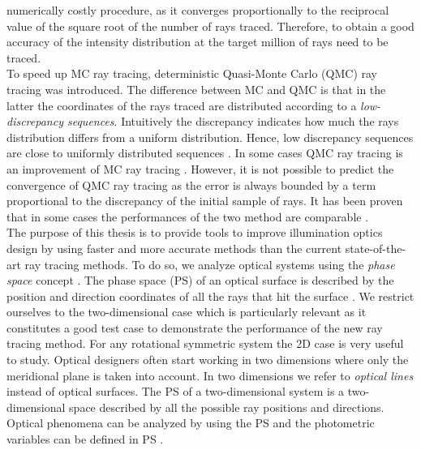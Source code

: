 numerically costly procedure, as it converges proportionally
to the reciprocal value of the square root of the number of rays
traced. Therefore, to obtain a good accuracy of the intensity distribution at the target million of rays need to be traced.\\ \indent To speed up MC ray tracing, deterministic Quasi-Monte Carlo (QMC) ray tracing was introduced. The difference between MC and QMC is that in the latter the coordinates of the rays traced are distributed according to a \textit{low-discrepancy sequences}. Intuitively the discrepancy indicates how much the rays distribution differs from a uniform distribution.  Hence, low discrepancy sequences are close to uniformly distributed sequences \cite{levy2002introduction}.
In some cases QMC ray tracing is an improvement of MC ray tracing \cite{ohbuchi1996quasi, caflisch1998monte}. However, it is not possible to predict the convergence of QMC ray tracing as the error is always bounded by a term proportional to the discrepancy of the initial sample of rays. It has been proven that in some cases the performances of the two method are comparable \cite{tuffin2004randomization}. 
\\ \indent The purpose of this thesis is to provide tools to improve illumination optics design by using faster and more accurate methods than the current state-of-the-art ray tracing methods.
To do so, we analyze optical systems using the \textit{phase space} concept \cite{torre2005linear}.
The phase space (PS) of an optical surface is described by the position and direction coordinates of all the rays that hit the surface \cite{testorf2009phase}. We restrict ourselves to the two-dimensional case which is particularly relevant as it constitutes a good test case to
demonstrate the performance of the new ray tracing method. For any rotational symmetric
system the 2D case is very useful to study. Optical designers often start working in two dimensions where only the
meridional plane is taken into account. In two dimensions we refer to \textit{optical lines} instead of optical surfaces. The PS of a two-dimensional system is a two-dimensional space described by all the possible ray positions and directions. 
\\ \indent Optical phenomena can be analyzed by using the PS and the photometric variables can be defined in PS \cite{rausch2014illumination}.  
